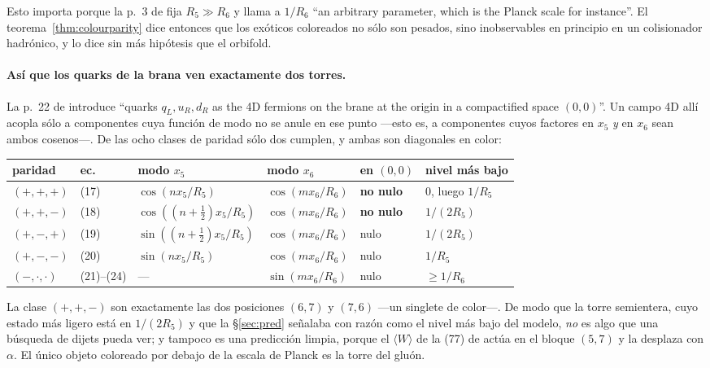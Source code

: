 \noindent Esto importa porque la p.~3 de \cite{KM25} fija $R_5\gg R_6$ y llama a $1/R_6$ ``an
arbitrary parameter, which is the Planck scale for instance''. El teorema~\ref{thm:colourparity}
dice entonces que los exóticos coloreados no sólo son pesados, sino inobservables en principio en
un colisionador hadrónico, y lo dice sin más hipótesis que el orbifold.

\paragraph{Así que los quarks de la brana ven exactamente dos torres.} La p.~22 de \cite{KM25}
introduce ``quarks $q_L,u_R,d_R$ as the 4D fermions on the brane at the origin in a compactified
space $(0,0)$''. Un campo 4D allí acopla sólo a componentes cuya función de modo no se anule en ese
punto ---esto es, a componentes cuyos factores en $x_5$ \emph{y} en $x_6$ sean ambos cosenos---. De
las ocho clases de paridad sólo dos cumplen, y ambas son diagonales en color:

\begin{center}\small
{}
\begin{tabular}{llllll}
\toprule
\rowcolor{hdrblue!10} paridad & ec. & modo $x_5$ & modo $x_6$ & en $(0,0)$ & nivel más bajo\\
\midrule
$(+,+,+)$ & (17) & $\cos(nx_5/R_5)$ & $\cos(mx_6/R_6)$ & \textbf{no nulo} & $0$, luego $1/R_5$\\
$(+,+,-)$ & (18) & $\cos((n{+}\tfrac12)x_5/R_5)$ & $\cos(mx_6/R_6)$ & \textbf{no nulo} & $1/(2R_5)$\\
$(+,-,+)$ & (19) & $\sin((n{+}\tfrac12)x_5/R_5)$ & $\cos(mx_6/R_6)$ & nulo & $1/(2R_5)$\\
$(+,-,-)$ & (20) & $\sin(nx_5/R_5)$ & $\cos(mx_6/R_6)$ & nulo & $1/R_5$\\
$(-,\cdot,\cdot)$ & (21)--(24) & --- & $\sin(mx_6/R_6)$ & nulo & $\ge 1/R_6$\\
\bottomrule
\end{tabular}
\end{center}

\noindent La clase $(+,+,-)$ son exactamente las dos posiciones $(6,7)$ y $(7,6)$ ---un singlete de
color---. De modo que la torre semientera, cuyo estado más ligero está en $1/(2R_5)$ y que la
\S\ref{sec:pred} señalaba con razón como el nivel más bajo del modelo, \emph{no} es algo que una
búsqueda de dijets pueda ver; y tampoco es una predicción limpia, porque el $\langle W\rangle$ de
la (77) de \cite{KM25} actúa en el bloque $(5,7)$ y la desplaza con $\alpha$. El único objeto
coloreado por debajo de la escala de Planck es la torre del gluón.

